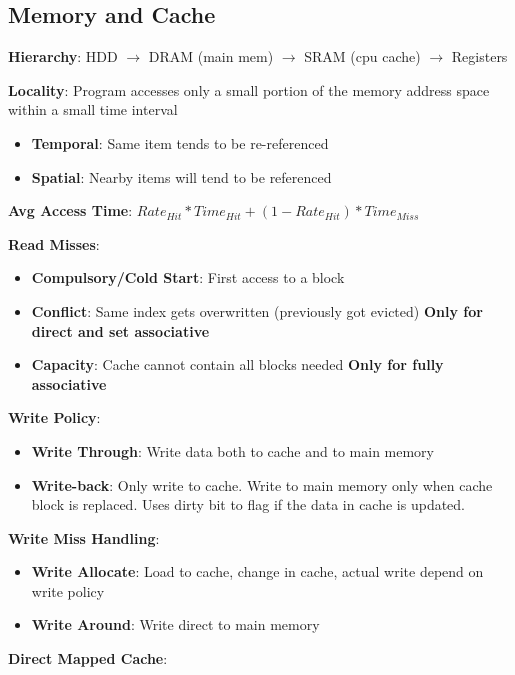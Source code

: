 \documentclass[a4paper,landscape]{article}
\newcommand{\rntopic}[1]{\vspace{-2.0em}\subsection*{#1}\vspace{-1.0em}}
\newcommand{\rnname}[1]{\textbf{#1}}
\begin{document}
\begin{multicols*}{4}
\rntopic{Memory and Cache}
\begin{flatitemize}
\item \rnname{Hierarchy}: HDD $\rightarrow$ DRAM (main mem) $\rightarrow$ SRAM (cpu cache) $\rightarrow$ Registers
\item \rnname{Locality}: Program accesses only a small portion of the memory address space within a small time interval
\vspace{-0.5em}
\begin{itemize}
\item \textbf{Temporal}: Same item tends to be re-referenced
\item \textbf{Spatial}: Nearby items will tend to be referenced 
\end{itemize}
\item \rnname{Avg Access Time}: $Rate_{Hit} * Time_{Hit} + (1 - Rate_{Hit}) * Time_{Miss}$
\item \rnname{Read Misses}:
\vspace{-0.5em}
\begin{itemize}
\item \textbf{Compulsory/Cold Start}: First access to a block
\item \textbf{Conflict}: Same index gets overwritten (previously got evicted) \textbf{Only for direct and set associative}
\item \textbf{Capacity}: Cache cannot contain all blocks needed \textbf{Only for fully associative}
\end{itemize}
\item \rnname{Write Policy}:
\vspace{-0.5em}
\begin{itemize}
\item \textbf{Write Through}: Write data both to cache and to main memory
\item \textbf{Write-back}: Only write to cache. Write to main memory only when cache block is replaced. Uses dirty bit to flag if the data in cache is updated.
\end{itemize}
\item \rnname{Write Miss Handling}:
\vspace{-0.5em}
\begin{itemize}
\item \textbf{Write Allocate}: Load to cache, change in cache, actual write depend on write policy
\item \textbf{Write Around}: Write direct to main memory
\end{itemize}
\item \rnname{Direct Mapped Cache}:

\end{flatitemize}
\end{multicols*}
\end{document}
